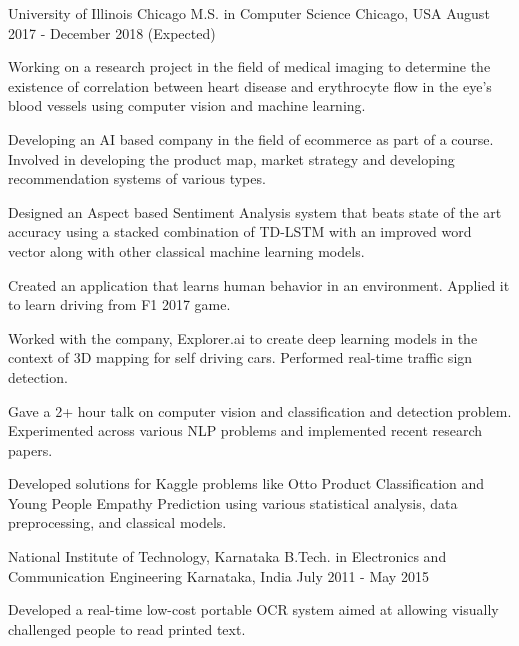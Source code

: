 

\begin{cventries}

  \cventry
    {University of Illinois Chicago} %
    {M.S. in Computer Science} %
    {Chicago, USA} %
    {August 2017 - December 2018 (Expected)} %
    {
      \begin{cvitems} %
        \item {Working on a research project in the field of medical imaging to determine the existence of correlation between heart disease and erythrocyte flow in the eye's blood vessels using computer vision and machine learning.}
        \item {Developing an AI based company in the field of ecommerce as part of a course. Involved in developing the product map, market strategy and developing recommendation systems of various types.}
        \item {Designed an Aspect based Sentiment Analysis system that beats state of the art accuracy using a stacked combination of TD-LSTM with an improved word vector along with other classical machine learning models.}
        \item {Created an application that learns human behavior in an environment. Applied it to learn driving from F1 2017 game.}
        \item {Worked with the company, Explorer.ai to create deep learning models in the context of 3D mapping for self driving cars. Performed real-time traffic sign detection.}
        \item {Gave a 2+ hour talk on computer vision and classification and detection problem. Experimented across various NLP problems and implemented recent research papers.}
        \item {Developed solutions for Kaggle problems like Otto Product Classification and Young People Empathy Prediction using various statistical analysis, data preprocessing, and classical models.}
      \end{cvitems}
    }

  \cventry
    {National Institute of Technology, Karnataka} %
    {B.Tech. in Electronics and Communication Engineering} %
    {Karnataka, India} %
    {July 2011 - May 2015} %
    {
      \begin{cvitems} %
        \item {Developed a real-time low-cost portable OCR system aimed at allowing visually challenged people to read printed text.}
      \end{cvitems}
    }

\end{cventries}
